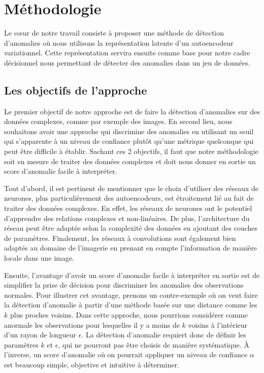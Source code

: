 \chapter{Méthodologie}     %
\label{chap:methodologie}                   %

Le cœur de notre travail consiste à proposer une méthode de détection d'anomalies où nous utilisons la représentation latente d'un autoencodeur variationnel. Cette représentation servira ensuite comme base pour notre cadre décisionnel nous permettant de détecter des anomalies dans un jeu de données.

\section{Les objectifs de l'approche}

Le premier objectif de notre approche est de faire la détection d'anomalies sur des données complexes, comme par exemple des images. En second lieu, nous souhaitons avoir une approche qui discrimine des anomalies en utilisant un seuil qui s'apparente à un niveau de confiance plutôt qu'une métrique quelconque qui peut être difficile à établir. Sachant ces 2 objectifs, il faut que notre méthodologie soit en mesure de traiter des données complexes et doit nous donner en sortie un score d'anomalie facile à interpréter.

Tout d'abord, il est pertinent de mentionner que le choix  d'utiliser des réseaux de neurones, plus particulièrement des autoencodeurs, est étroitement lié au fait de traiter des données complexes. En effet, les réseaux de neurones ont le potentiel d'apprendre des relations complexes et non-linéaires. De plus, l'architecture du réseau peut être adaptée selon la complexité des données en ajoutant des couches de paramètres. Finalement, les réseaux à convolutions sont également bien adaptés au domaine de l'imagerie en prenant en compte l'information de manière locale dans une image.

Ensuite, l'avantage d'avoir un score d'anomalie facile à interpréter en sortie est de simplifier la prise de décision pour discriminer les anomalies des observations normales. Pour illustrer cet avantage, prenons un contre-exemple où on veut faire la détection d'anomalie à partir d'une méthode basée sur une distance comme les $k$ plus proches voisins. Dans cette approche, nous pourrions considérer comme anormale les observations pour lesquelles il y a moins de $k$ voisins à l'intérieur d'un rayon de longueur $\epsilon$. La détection d'anomalie requiert donc de définir les paramètres $k$ et $\epsilon$, qui ne pourront pas être choisis de manière systématique. À l'inverse, un score d'anomalie où on pourrait appliquer un niveau de confiance $\alpha$ est beaucoup simple, objective et intuitive à déterminer.

